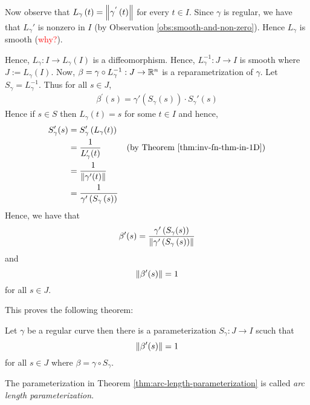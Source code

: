Now observe that $L_{\gamma} \left( t \right) = \left\lVert \gamma ^{'} \left( t \right) \right\rVert$ for every $t\in I$. Since $\gamma$ is regular, we have that $L_{\gamma}'$ is nonzero in $I$ (by Observation \ref{obs:smooth-and-non-zero}). Hence $L_{\gamma}$ is smooth (\textcolor{red}{why?}).

Hence, $L_{\gamma} : I \to L_{\gamma} \left( I \right)$ is a diffeomorphism. Hence, $L_{\gamma} ^{-1} : J \to I$ is smooth where $J := L_{\gamma} \left( I \right)$. Now, $\beta = \gamma \circ L_{\gamma} ^{-1} : J \to \mathbb R ^{n}$ is a reparametrization of $\gamma$. Let $S_{\gamma} = L_{\gamma}^{-1}$. Thus for all $s \in J$,
\begin{align*}
    \beta ^{'} \left( s \right) = \gamma ' \left( S_{\gamma} (s) \right) \cdot S_{\gamma} '(s)
\end{align*}
Hence if $s \in S$ then $L_{\gamma} (t) =s$ for some $t\in I$ and hence,
\begin{align*}
    S_{\gamma} ' (s) &= S_{\gamma} ' \left( L_{\gamma} (t) \right)  & \\
    &= \frac{1}{L_{\gamma} ' (t)} & (\text{by Theorem \ref{thm:inv-fn-thm-in-1D}}) \\
    &= \frac{1}{\left\lVert \gamma ' (t) \right\rVert} \\
    &= \frac{1}{\gamma ' \left( S_{\gamma} \left( s \right) \right)}
\end{align*}
Hence, we have that 
\begin{equation*}
    \beta ' (s) = \frac{\gamma ' \left( S_{\gamma} (s) \right)}{\left\lVert \gamma ' \left( S_{\gamma} \left( s \right) \right) \right\rVert}
\end{equation*}
and
\begin{equation*}
    \left\lVert \beta ' (s) \right\rVert =1
\end{equation*}
for all $s \in J$.

This proves the following theorem:
\begin{theorem}
    Let $\gamma$ be a regular curve then there is a parameterization $S_{\gamma} : J \to I$ scuch that 
    \begin{equation*}
	\left\lVert \beta ' (s) \right\rVert =1
    \end{equation*}
    for all $s\in J$ where $\beta = \gamma \circ S_{\gamma}$.
    \label{thm:arc-length-parameterization}
\end{theorem}

\begin{definition}
    The parameterization in Theorem \ref{thm:arc-length-parameterization} is called \textit{arc length parameterization}.
    \label{def:arc-length-prmtrztn}
\end{definition}


